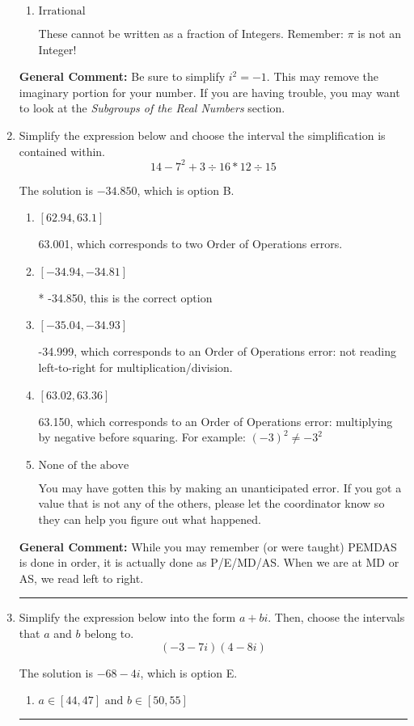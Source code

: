 \documentclass{extbook}[14pt]
\newcommand{\litem}[1]{\item #1

\rule{\textwidth}{0.4pt}}
\begin{document}
\begin{enumerate}
{\begin{enumerate}[label=\Alph*.]
This is not a number. The only non-Complex number we know is dividing by 0 as this is not a number!
\item \( \text{Irrational} \)

These cannot be written as a fraction of Integers. Remember: $\pi$ is not an Integer!
\end{enumerate}

\textbf{General Comment:} Be sure to simplify $i^2 = -1$. This may remove the imaginary portion for your number. If you are having trouble, you may want to look at the \textit{Subgroups of the Real Numbers} section.
}
\litem{
Simplify the expression below and choose the interval the simplification is contained within.
\[ 14 - 7^2 + 3 \div 16 * 12 \div 15 \]

The solution is \( -34.850 \), which is option B.\begin{enumerate}[label=\Alph*.]
\item \( [62.94, 63.1] \)

 63.001, which corresponds to two Order of Operations errors.
\item \( [-34.94, -34.81] \)

* -34.850, this is the correct option
\item \( [-35.04, -34.93] \)

 -34.999, which corresponds to an Order of Operations error: not reading left-to-right for multiplication/division.
\item \( [63.02, 63.36] \)

 63.150, which corresponds to an Order of Operations error: multiplying by negative before squaring. For example: $(-3)^2 \neq -3^2$
\item \( \text{None of the above} \)

 You may have gotten this by making an unanticipated error. If you got a value that is not any of the others, please let the coordinator know so they can help you figure out what happened.
\end{enumerate}

\textbf{General Comment:} While you may remember (or were taught) PEMDAS is done in order, it is actually done as P/E/MD/AS. When we are at MD or AS, we read left to right.
}
\litem{
Simplify the expression below into the form $a+bi$. Then, choose the intervals that $a$ and $b$ belong to.
\[ (-3 - 7 i)(4 - 8 i) \]

The solution is \( -68 - 4 i \), which is option E.\begin{enumerate}[label=\Alph*.]
\item \( a \in [44, 47] \text{ and } b \in [50, 55] \)


\end{enumerate}}
\end{enumerate}
\end{document}
